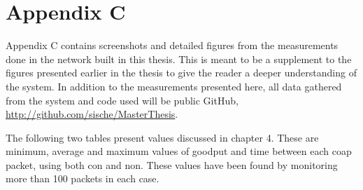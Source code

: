 \chapter{Appendix C}
\label{chp:appendixb}

Appendix C contains screenshots and detailed figures from the measurements done in the network built in this thesis. This is meant to be a supplement to the figures presented earlier in the thesis to give the reader a deeper understanding of the system. In addition to the measurements presented here, all data gathered from the system and code used will be public GitHub, \url{http://github.com/sische/MasterThesis}. 


The following two tables present values discussed in chapter 4. These are minimum, average and maximum values of goodput and time between each \gls{coap} packet, using both \gls{con} and \gls{non}. These values have been found by monitoring more than 100 packets in each case. 



